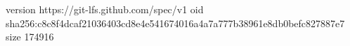 version https://git-lfs.github.com/spec/v1
oid sha256:c8c8f4dcaf21036403cd8e4e541674016a4a7a777b38961e8db0befc827887e7
size 174916

